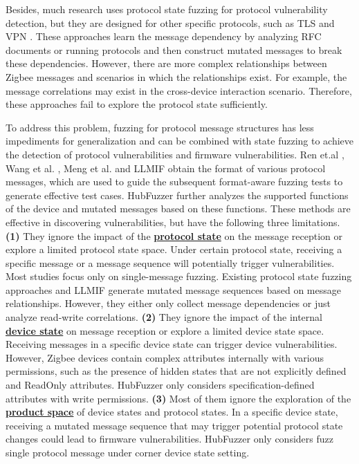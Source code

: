 \documentclass[10pt,journal,compsoc]{IEEEtran}
\begin{document}
Besides, much research \cite{gascon2015pulsar, de2015protocol, daniel2018inferring, chen2019exploring, song2019spfuzz, fiterau2020analysis, natella2022stateafl} uses protocol state fuzzing for protocol vulnerability detection, but they are designed for other specific protocols, such as TLS \cite{de2015protocol, fiterau2020analysis} and VPN \cite{daniel2018inferring}. These approaches learn the message dependency by analyzing RFC documents or running protocols and then construct mutated messages to break these dependencies. However, there are more complex relationships between Zigbee messages and scenarios in which the relationships exist. For example, the message correlations may exist in the cross-device interaction scenario. Therefore, these approaches fail to explore the protocol state sufficiently.

To address this problem, fuzzing for protocol message structures \cite{ren2021z, wang2022don, ma2023no, meng2024large, wang2024llmif} has less impediments for generalization and can be combined with state fuzzing to achieve the detection of protocol vulnerabilities and firmware vulnerabilities. Ren et.al  \cite{ren2021z}, Wang et al. \cite{wang2022don}, Meng et al. \cite{meng2024large} and LLMIF \cite{wang2024llmif} obtain the format of various protocol messages, which are used to guide the subsequent format-aware fuzzing tests to generate effective test cases. HubFuzzer \cite{ma2023no} further analyzes the supported functions of the device and mutated messages based on these functions. These methods are effective in discovering vulnerabilities, but have the following three limitations.  \textbf{(1)} They ignore the impact of the \underline{\textbf{protocol state}} on the message reception or explore a limited protocol state space. Under certain protocol state, receiving a specific message or a message sequence will potentially trigger vulnerabilities. Most studies focus only on single-message fuzzing. Existing protocol state fuzzing approaches and LLMIF generate mutated message sequences based on message relationships. However, they either only collect message dependencies or just analyze read-write correlations. \textbf{(2)} They ignore the impact of the internal \underline{\textbf{device state}} on message reception or explore a limited device state space. Receiving messages in a specific device state can trigger device vulnerabilities. However, Zigbee devices contain complex attributes internally with various permissions, such as the presence of hidden states that are not explicitly defined and ReadOnly attributes. HubFuzzer only considers specification-defined attributes with write permissions. \textbf{(3)} Most of them ignore the exploration of the \underline{\textbf{product space}} of device states and protocol states. In a specific device state, receiving a mutated message sequence that may trigger potential protocol state changes could lead to firmware vulnerabilities. HubFuzzer only considers fuzz single protocol message under corner device state setting.\vspace{0.1cm}
\end{document}
